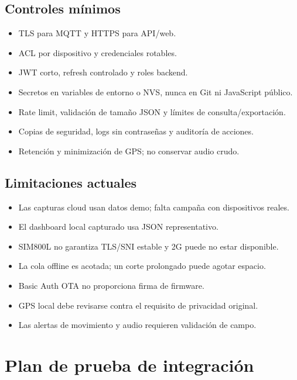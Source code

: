 \documentclass[11pt,a4paper,oneside]{report}
\begin{document}
\section{Controles mínimos}
\begin{itemize}
  \item TLS para MQTT y HTTPS para API/web.
  \item ACL por dispositivo y credenciales rotables.
  \item JWT corto, refresh controlado y roles backend.
  \item Secretos en variables de entorno o NVS, nunca en Git ni JavaScript público.
  \item Rate limit, validación de tamaño JSON y límites de consulta/exportación.
  \item Copias de seguridad, logs sin contraseñas y auditoría de acciones.
  \item Retención y minimización de GPS; no conservar audio crudo.
\end{itemize}

\section{Limitaciones actuales}
\begin{itemize}
  \item Las capturas cloud usan datos demo; falta campaña con dispositivos reales.
  \item El dashboard local capturado usa JSON representativo.
  \item SIM800L no garantiza TLS/SNI estable y 2G puede no estar disponible.
  \item La cola offline es acotada; un corte prolongado puede agotar espacio.
  \item Basic Auth OTA no proporciona firma de firmware.
  \item GPS local debe revisarse contra el requisito de privacidad original.
  \item Las alertas de movimiento y audio requieren validación de campo.
\end{itemize}

\chapter{Plan de prueba de integración}
\end{document}
